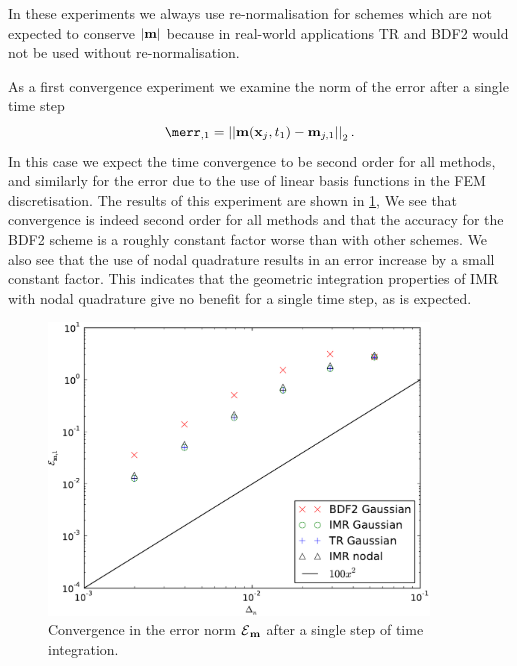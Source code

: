 In these experiments we always use re-normalisation for schemes which are not expected to conserve $\left|{\boldsymbol{\mathrm{m}}} \right|$ because in real-world applications TR and BDF2 would not be used without re-normalisation.



As a first convergence experiment we examine the norm of the error after a single time step
\begin{equation}
  \merr_{,1} = \norm{\mv(\xv_j, t_1) - \mv_{j,1}}_2.
\end{equation}
In this case we expect the time convergence to be second order for all methods, and similarly for the error due to the use of linear basis functions in the FEM discretisation.
The results of this experiment are shown in \cref{fig:convergence-one-step},
We see that convergence is indeed second order for all methods and that the accuracy for the BDF2 scheme is a roughly constant factor worse than with other schemes.
We also see that the use of nodal quadrature results in an error increase by a small constant factor.
This indicates that the geometric integration properties of IMR with nodal quadrature give no benefit for a single time step, as is expected.
\begin{figure}
  \centering
  \includegraphics[width=0.9\textwidth]{plots/2d_wave_solution_convergence_long_time/firstoferrornormsvsfakemeanofdts.pdf}
  \caption{Convergence in the error norm $\mathcal{E}{}_{\boldsymbol{\mathrm{m}}}{}$ after a single step of time integration.}
  \label{fig:convergence-one-step}
\end{figure}



